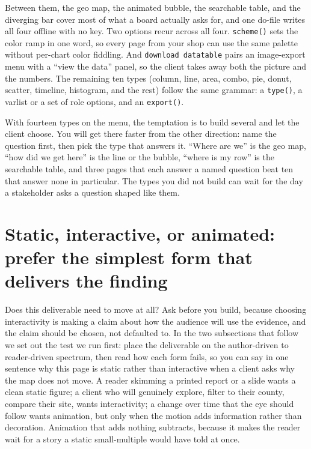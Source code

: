 Between them, the geo map, the animated bubble, the searchable table, and the diverging bar cover most of what a board actually asks for, and one do-file writes all four offline with no key. Two options recur across all four. \texttt{scheme()} sets the color ramp in one word, so every page from your shop can use the same palette without per-chart color fiddling. And \texttt{download datatable} pairs an image-export menu with a \enquote{view the data} panel, so the client takes away both the picture and the numbers. The remaining ten types (column, line, area, combo, pie, donut, scatter, timeline, histogram, and the rest) follow the same grammar: a \texttt{type()}, a varlist or a set of role options, and an \texttt{export()}.

With fourteen types on the menu, the temptation is to build several and let the client choose. You will get there faster from the other direction: name the question first, then pick the type that answers it. \enquote{Where are we} is the geo map, \enquote{how did we get here} is the line or the bubble, \enquote{where is my row} is the searchable table, and three pages that each answer a named question beat ten that answer none in particular. The types you did not build can wait for the day a stakeholder asks a question shaped like them.

\section{Static, interactive, or animated: prefer the simplest form that delivers the finding}
Does this deliverable need to move at all? Ask before you build, because choosing interactivity is making a claim about how the audience will use the evidence, and the claim should be chosen, not defaulted to. In the two subsections that follow we set out the test we run first: place the deliverable on the author-driven to reader-driven spectrum, then read how each form fails, so you can say in one sentence why this page is static rather than interactive when a client asks why the map does not move. A reader skimming a printed report or a slide wants a clean static figure; a client who will genuinely explore, filter to their county, compare their site, wants interactivity; a change over time that the eye should follow wants animation, but only when the motion adds information rather than decoration. Animation that adds nothing subtracts, because it makes the reader wait for a story a static small-multiple would have told at once.

